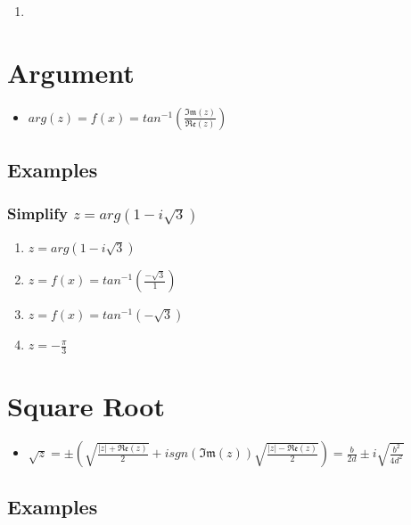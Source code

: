\documentclass{report}
\newcommand{\re}[1]{\mathfrak{Re}(#1)}
\newcommand{\im}[1]{\mathfrak{Im}(#1)}
\newcommand{\abs}[1]{\mathopen|#1\mathclose|}
\newcommand{\sgn}[1]{sgn(#1)}
\renewcommand{\arg}[1]{arg(#1)}
\renewcommand{\arctan}[1]{f(x)=tan^{-1}(#1)}
\begin{document}
                \subsubsection{}
                    \begin{enumerate}
                        \item 
                    \end{enumerate}
        \section{Argument}
            \begin{itemize}
                \item $\arg{z}=\arctan{\frac{\im{z}}{\re{z}}}$
            \end{itemize}
            \subsection{Examples}
                \subsubsection{Simplify $z=\arg{1-i\sqrt{3}}$}
                    \begin{enumerate}
                        \item $z=\arg{1-i\sqrt{3}}$
                        \item $z=\arctan{\frac{-\sqrt{3}}{1}}$
                        \item $z=\arctan{-\sqrt{3}}$
                        \item $z=-\frac{\pi}{3}$
                    \end{enumerate}
        \section{Square Root}
            \begin{itemize}
                \item $\sqrt{z}=\pm(\sqrt{\frac{\abs{z}+\re{z}}{2}}+i\sgn{\im{z}}\sqrt{\frac{\abs{z}-\re{z}}{2}})=\frac{b}{2d}\pm i\sqrt{\frac{b^2}{4d^2}}$
            \end{itemize}
            \subsection{Examples}
\end{document}

